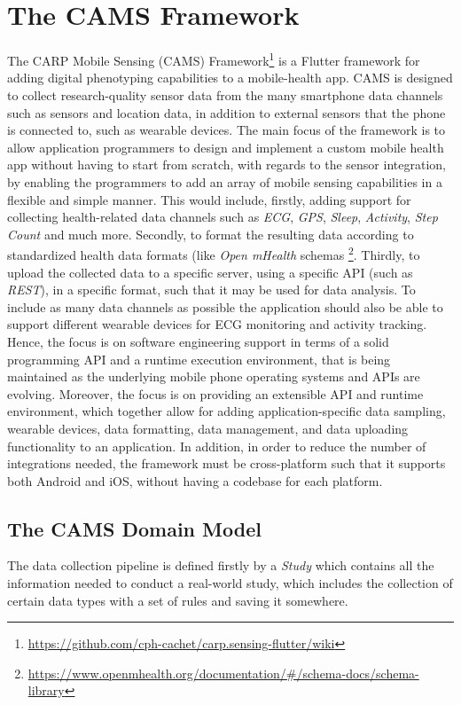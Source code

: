\section{The CAMS Framework}
The CARP Mobile Sensing (CAMS) Framework\footnote{\url{https://github.com/cph-cachet/carp.sensing-flutter/wiki}} is a Flutter framework for adding digital phenotyping capabilities to a mobile-health app. CAMS is designed to collect research-quality sensor data from the many smartphone data channels such as sensors and location data, in addition to external sensors that the phone is connected to, such as wearable devices. The main focus of the framework is to allow application programmers to design and implement a custom mobile health app without having to start from scratch, with regards to the sensor integration, by enabling the programmers to add an array of mobile sensing capabilities in a flexible and simple manner. This would include, firstly, adding support for collecting health-related data channels such as \textit{ECG}, \textit{GPS}, \textit{Sleep}, \textit{Activity}, \textit{Step Count} and much more. Secondly, to format the resulting data according to standardized health data formats (like \textit{Open mHealth} schemas \footnote{\url{https://www.openmhealth.org/documentation/#/schema-docs/schema-library}}. Thirdly, to upload the collected data to a specific server, using a specific API (such as \textit{REST}), in a specific format, such that it may be used for data analysis. To include as many data channels as possible the application should also be able to support different wearable devices for ECG monitoring and activity tracking. Hence, the focus is on software engineering support in terms of a solid programming API and a runtime execution environment, that is being maintained as the underlying mobile phone operating systems and APIs are evolving. Moreover, the focus is on providing an extensible API and runtime environment, which together allow for adding application-specific data sampling, wearable devices, data formatting, data management, and data uploading functionality to an application. In addition, in order to reduce the number of integrations needed, the framework must be cross-platform such that it supports both Android and iOS, without having a codebase for each platform.

\subsection{The CAMS Domain Model}
The data collection pipeline is defined firstly by a \textit{Study} which contains all the information needed to conduct a real-world study, which includes the collection of certain data types with a set of rules and saving it somewhere. 

